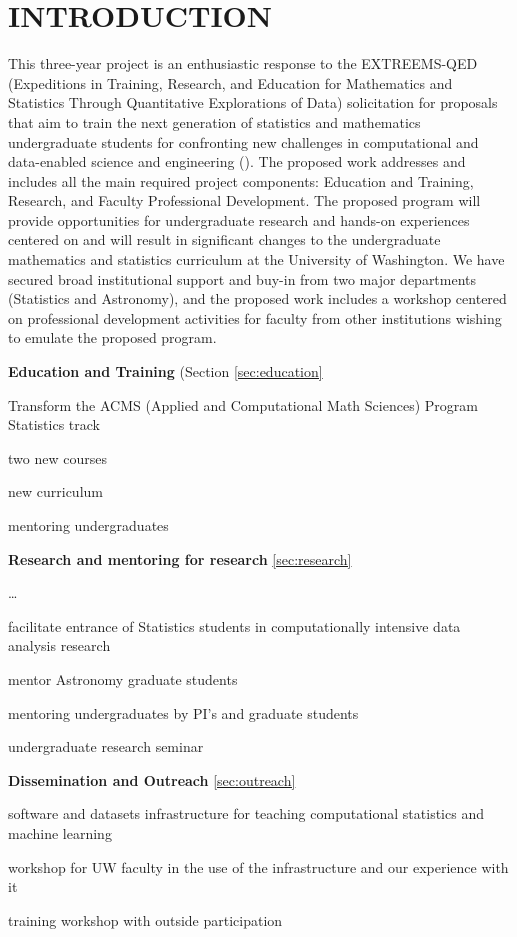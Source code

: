 \section{ INTRODUCTION}

This three-year project is an enthusiastic response to the EXTREEMS-QED (Expeditions in Training, Research, 
and Education for Mathematics and Statistics Through Quantitative Explorations of Data) solicitation for proposals
that aim to train the next generation of statistics and mathematics undergraduate students for confronting new
challenges in computational and data-enabled science and engineering (\cdse).  The proposed work addresses and 
includes all the main required project components: Education and Training, Research, and Faculty Professional 
Development. The proposed program will provide opportunities for undergraduate research and hands-on experiences 
centered on \cdse and will result in significant changes to the undergraduate mathematics and statistics curriculum 
at the University of Washington. We have secured broad institutional support and buy-in from two major departments 
(Statistics and Astronomy), and the proposed work includes a workshop centered on professional development activities
for faculty from other institutions wishing to emulate the proposed program. 

\bits
\item[]{\bf Education and Training} (Section \ref{sec:education} 
\item Transform the ACMS (Applied and Computational Math Sciences) Program Statistics track
  \bits
  \item two new courses
  \item new curriculum 
  \item mentoring undergraduates
  \eits
\item {\bf Research and mentoring for research} \ref{sec:research} 
  \bits
  \item \ldots
  \item facilitate entrance of Statistics students in computationally intensive data analysis research
  \item mentor Astronomy graduate students 
  \item mentoring undergraduates by PI's and graduate students
  \item undergraduate research seminar
  \eits
\item {\bf Dissemination and Outreach} \ref{sec:outreach}
  \bits
  \item software and datasets infrastructure for teaching computational statistics and machine learning 
  \item workshop for UW faculty in the use of the infrastructure and our experience with it
  \item training workshop with outside participation 
  \eits
\eits  

